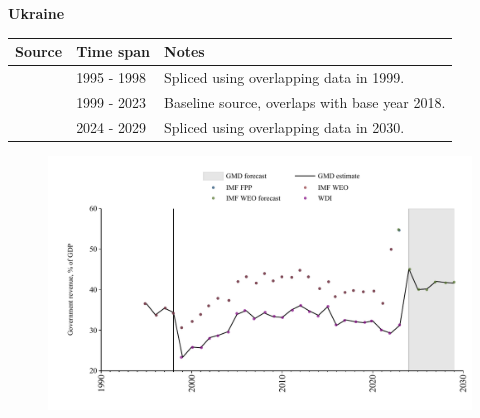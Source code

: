 \documentclass[12pt,a4paper,landscape]{article}
\begin{document}
\begin{adjustbox}{max totalsize={\paperwidth}{\paperheight},center}
\begin{minipage}[t][\textheight][t]{\textwidth}
\vspace*{0.5cm}
{}
\begin{center}
{\Large\bfseries Ukraine}
\end{center}
\vspace{0.5cm}
\begin{table}[H]
\centering
\small
\begin{tabular}{|l|l|l|}
\hline
\textbf{Source} & \textbf{Time span} & \textbf{Notes} \\
\hline
\rowcolor{white}\cite{IMF_WEO}& 1995 - 1998 &Spliced using overlapping data in 1999.\\
\rowcolor{lightgray}\cite{WDI}& 1999 - 2023 &Baseline source, overlaps with base year 2018.\\
\rowcolor{white}\cite{IMF_WEO_forecast}& 2024 - 2029 &Spliced using overlapping data in 2030.\\
\hline
\end{tabular}
\end{table}
\begin{figure}[H]
\centering
\includegraphics[width=\textwidth,height=0.6\textheight,keepaspectratio]{graphs/UKR_govrev_GDP.pdf}
\end{figure}
\end{minipage}
\end{adjustbox}
\end{document}
